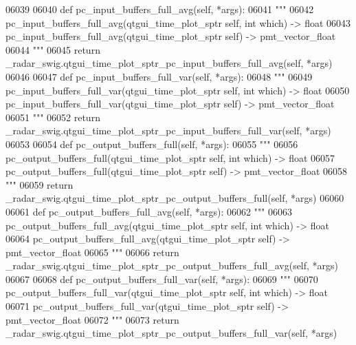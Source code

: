 \begin{DoxyCode}
{{{{{{{{{{{{{{{{{{{{06039 
06040     \textcolor{keyword}{def }pc_input_buffers_full_avg(self, *args):
06041         \textcolor{stringliteral}{"""}
06042 \textcolor{stringliteral}{        pc\_input\_buffers\_full\_avg(qtgui\_time\_plot\_sptr self, int which) -> float}
06043 \textcolor{stringliteral}{        pc\_input\_buffers\_full\_avg(qtgui\_time\_plot\_sptr self) -> pmt\_vector\_float}
06044 \textcolor{stringliteral}{        """}
06045         \textcolor{keywordflow}{return} \_radar\_swig.qtgui\_time\_plot\_sptr\_pc\_input\_buffers\_full\_avg(self, *args)
06046 
06047     \textcolor{keyword}{def }pc_input_buffers_full_var(self, *args):
06048         \textcolor{stringliteral}{"""}
06049 \textcolor{stringliteral}{        pc\_input\_buffers\_full\_var(qtgui\_time\_plot\_sptr self, int which) -> float}
06050 \textcolor{stringliteral}{        pc\_input\_buffers\_full\_var(qtgui\_time\_plot\_sptr self) -> pmt\_vector\_float}
06051 \textcolor{stringliteral}{        """}
06052         \textcolor{keywordflow}{return} \_radar\_swig.qtgui\_time\_plot\_sptr\_pc\_input\_buffers\_full\_var(self, *args)
06053 
06054     \textcolor{keyword}{def }pc_output_buffers_full(self, *args):
06055         \textcolor{stringliteral}{"""}
06056 \textcolor{stringliteral}{        pc\_output\_buffers\_full(qtgui\_time\_plot\_sptr self, int which) -> float}
06057 \textcolor{stringliteral}{        pc\_output\_buffers\_full(qtgui\_time\_plot\_sptr self) -> pmt\_vector\_float}
06058 \textcolor{stringliteral}{        """}
06059         \textcolor{keywordflow}{return} \_radar\_swig.qtgui\_time\_plot\_sptr\_pc\_output\_buffers\_full(self, *args)
06060 
06061     \textcolor{keyword}{def }pc_output_buffers_full_avg(self, *args):
06062         \textcolor{stringliteral}{"""}
06063 \textcolor{stringliteral}{        pc\_output\_buffers\_full\_avg(qtgui\_time\_plot\_sptr self, int which) -> float}
06064 \textcolor{stringliteral}{        pc\_output\_buffers\_full\_avg(qtgui\_time\_plot\_sptr self) -> pmt\_vector\_float}
06065 \textcolor{stringliteral}{        """}
06066         \textcolor{keywordflow}{return} \_radar\_swig.qtgui\_time\_plot\_sptr\_pc\_output\_buffers\_full\_avg(self, *args)
06067 
06068     \textcolor{keyword}{def }pc_output_buffers_full_var(self, *args):
06069         \textcolor{stringliteral}{"""}
06070 \textcolor{stringliteral}{        pc\_output\_buffers\_full\_var(qtgui\_time\_plot\_sptr self, int which) -> float}
06071 \textcolor{stringliteral}{        pc\_output\_buffers\_full\_var(qtgui\_time\_plot\_sptr self) -> pmt\_vector\_float}
06072 \textcolor{stringliteral}{        """}
06073         \textcolor{keywordflow}{return} \_radar\_swig.qtgui\_time\_plot\_sptr\_pc\_output\_buffers\_full\_var(self, *args)
}}}}}}}}}}}}}}}}}}}}
\end{DoxyCode}
